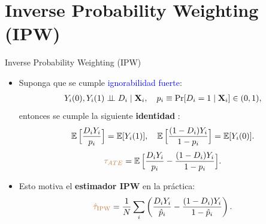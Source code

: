 \documentclass[10pt, xcolor=dvipsnames]{beamer}
\begin{document}
\section{Inverse Probability Weighting (IPW)}

\begin{frame}{Inverse Probability Weighting (IPW)}\label{DIAP:DEMOS}
\begin{itemize}
    \item Suponga que se cumple \textcolor{blue}{ignorabilidad fuerte}:
    \vspace{-0.1em}
    \begin{align*}
        Y_i(0),Y_i(1) \perp \!\!\! \perp D_i \mid \textbf{X}_i,\quad p_i \equiv \Pr[D_i=1\mid \textbf{X}_i] \in (0,1),
    \end{align*} 
    entonces se cumple la siguiente \textbf{identidad} \citep{horvitz1952}:
    \vspace{-0.85em}
    \begin{align*}
        \operatorname{\mathbb{E}} \Big[\frac{D_i Y_i}{p_i}\Big]=\operatorname{\mathbb{E}}[Y_i(1)], 
        \quad
        \operatorname{\mathbb{E}} \Big[\frac{(1-D_i) Y_i}{1-p_i}\Big]=\operatorname{\mathbb{E}}[Y_i(0)].
    \end{align*}    
    \hyperlink{Demostracion-IPW}{{}}%
    \vspace{-1.2em} 
    \begin{align*}
        \textcolor{brown}{\tau_{ATE}} = \operatorname{\mathbb{E}} \Big[\frac{D_i Y_i}{p_i} - \frac{(1-D_i) Y_i}{1-p_i}\Big].      
    \end{align*}
    \item Esto motiva el \textbf{estimador IPW} en la práctica:
    \vspace{-0.6em}
    \begin{align*}
    \textcolor{brown}{\hat\tau_{\text{IPW}}}
    = \frac{1}{N}\sum_{i}
      \left(\frac{D_i Y_i}{\hat p_i}
      - \frac{(1-D_i) Y_i}{1-\hat p_i}\right). 
    \end{align*}
\end{itemize}
\end{frame}
\end{document}
